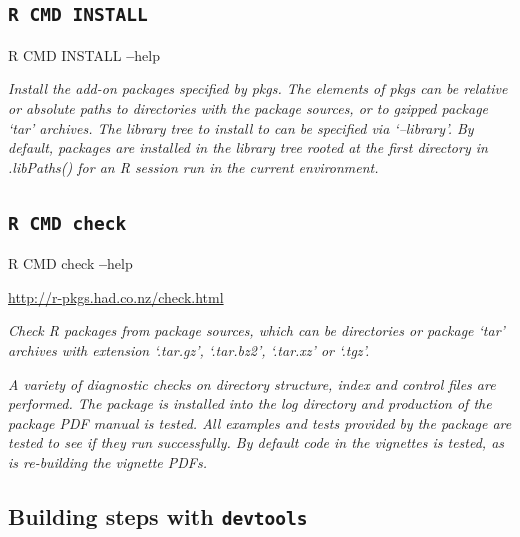 \documentclass[]{book}
\newenvironment{Shaded}{\begin{snugshade}}{\end{snugshade}}
\newcommand{\OperatorTok}[1]{\textcolor[rgb]{0.81,0.36,0.00}{\textbf{#1}}}
\newcommand{\NormalTok}[1]{#1}
\theoremstyle{definition}
\theoremstyle{definition}
\theoremstyle{definition}
\theoremstyle{remark}
\begin{document}
\subsection{\texorpdfstring{\texttt{R\ CMD\ INSTALL}}{R CMD INSTALL}}\label{r-cmd-install}

\begin{Shaded}
\begin{Highlighting}[]
\NormalTok{R CMD INSTALL }\OperatorTok{--}\NormalTok{help}
\end{Highlighting}
\end{Shaded}

\emph{Install the add-on packages specified by pkgs. The elements of
pkgs can be relative or absolute paths to directories with the package
sources, or to gzipped package `tar' archives. The library tree to
install to can be specified via `--library'. By default, packages are
installed in the library tree rooted at the first directory in
.libPaths() for an R session run in the current environment.}

\subsection{\texorpdfstring{\texttt{R\ CMD\ check}}{R CMD check}}\label{r-cmd-check}

\begin{Shaded}
\begin{Highlighting}[]
\NormalTok{R CMD check }\OperatorTok{--}\NormalTok{help}
\end{Highlighting}
\end{Shaded}

\url{http://r-pkgs.had.co.nz/check.html}

\emph{Check R packages from package sources, which can be directories or
package `tar' archives with extension `.tar.gz', `.tar.bz2', `.tar.xz'
or `.tgz'.}

\emph{A variety of diagnostic checks on directory structure, index and
control files are performed. The package is installed into the log
directory and production of the package PDF manual is tested. All
examples and tests provided by the package are tested to see if they run
successfully. By default code in the vignettes is tested, as is
re-building the vignette PDFs.}

\subsection{\texorpdfstring{Building steps with
\texttt{devtools}}{Building steps with devtools}}\label{building-steps-with-devtools}
\end{document}
